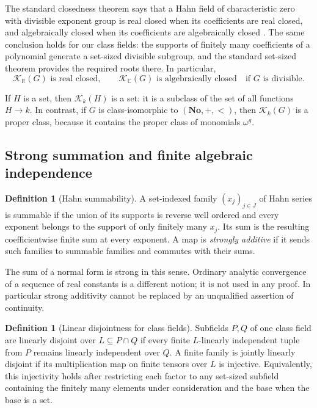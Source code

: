 \documentclass[11pt,letterpaper]{article}
\theoremstyle{definition}
\newtheorem{definition}[theorem]{Definition}
\theoremstyle{remark}
\newcommand{\No}{\mathbf{No}}
\newcommand{\R}{\mathbb R}
\newcommand{\C}{\mathbb C}
\newcommand{\K}[2]{\mathcal K_{#1}(#2)}
\numberwithin{equation}{section}
\begin{document}
The standard closedness theorem says that a Hahn field of characteristic
zero with divisible exponent group is real closed when its coefficients are
real closed, and algebraically closed when its coefficients are algebraically
closed \cite{LM}. The same conclusion holds for our class fields: the
supports of finitely many coefficients of a polynomial generate a set-sized
divisible subgroup, and the standard set-sized theorem provides the required
roots there. In particular,
\[
 \K{\R}{G}\text{ is real closed},\qquad
 \K{\C}{G}\text{ is algebraically closed}
 \quad\text{if }G\text{ is divisible}.
\]

If $H$ is a set, then $\K{k}{H}$ is a set: it is a subclass of the set
of all functions $H\to k$. In contrast, if $G$ is class-isomorphic to
$(\No,+,<)$, then $\K{k}{G}$ is a proper class, because it contains the
proper class of monomials $\omega^g$.

\subsection{Strong summation and finite algebraic independence}

\begin{definition}[Hahn summability]
A set-indexed family $(x_j)_{j\in J}$ of Hahn series is summable if the union
of its supports is reverse well ordered and every exponent belongs to the
support of only finitely many $x_j$. Its sum is the resulting coefficientwise
finite sum at every exponent. A map is \emph{strongly additive} if it sends
such families to summable families and commutes with their sums.
\end{definition}

The sum of a normal form is strong in this sense. Ordinary analytic
convergence of a sequence of real constants is a different notion; it is
not used in any proof. In particular strong additivity cannot be replaced by
an unqualified assertion of continuity.

\begin{definition}[Linear disjointness for class fields]
Subfields $P,Q$ of one class field are linearly disjoint over $L\subseteq
P\cap Q$ if every finite $L$-linearly independent tuple from $P$ remains
linearly independent over $Q$. A finite family is jointly linearly disjoint
if its multiplication map on finite tensors over $L$ is injective.
Equivalently, this injectivity holds after restricting each factor to any
set-sized subfield containing the finitely many elements under consideration
and the base when the base is a set.
\end{definition}
\end{document}
